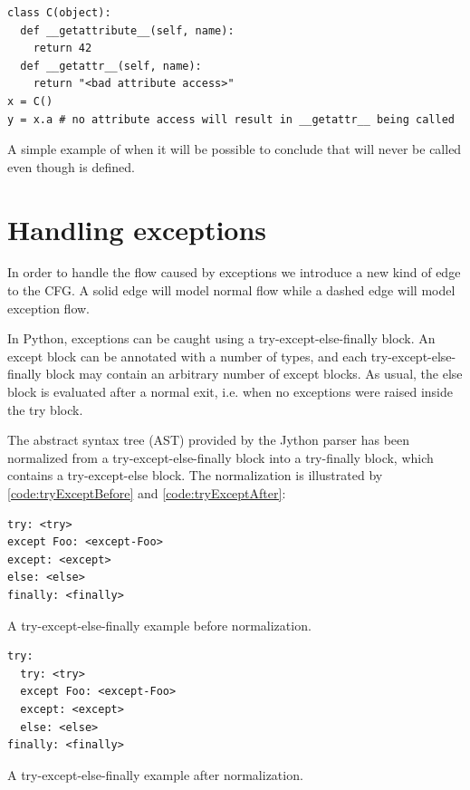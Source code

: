 \begin{listing}[H]
  \begin{verbatim}
class C(object):
  def __getattribute__(self, name):
    return 42
  def __getattr__(self, name):
    return "<bad attribute access>"
x = C()
y = x.a # no attribute access will result in __getattr__ being called
  \end{verbatim}
  \caption{A simple example of when it will be possible to conclude that  will never be called even though  is defined.}
  \label{code:MagicMethods2}
\end{listing}



\section{Handling exceptions}
\label{section:Handling exceptions}
In order to handle the flow caused by exceptions we introduce a new kind of edge to the CFG. A solid edge will model normal flow while a dashed edge will model exception flow. 

In Python, exceptions can be caught using a try-except-else-finally block. An except block can be annotated with a number of types, and each try-except-else-finally block may contain an arbitrary number of except blocks. As usual, the else block is evaluated after a normal exit, i.e. when no exceptions were raised inside the try block.

The abstract syntax tree (AST) provided by the Jython parser \cite{jython} has been normalized from a try-except-else-finally block into a try-finally block, which contains a try-except-else block. The normalization is illustrated by \autoref{code:tryExceptBefore} and \autoref{code:tryExceptAfter}:

\begin{listing}[H]
	\begin{verbatim}
try: <try>
except Foo: <except-Foo>
except: <except>
else: <else>
finally: <finally>
	\end{verbatim}
	\caption{A try-except-else-finally example before normalization.}
  \label{code:tryExceptBefore}
\end{listing}

\begin{listing}[H]
	\begin{verbatim}
try: 
  try: <try>
  except Foo: <except-Foo>
  except: <except>
  else: <else>
finally: <finally>
	\end{verbatim}
	\caption{A try-except-else-finally example after normalization.}
  \label{code:tryExceptAfter}
\end{listing}

